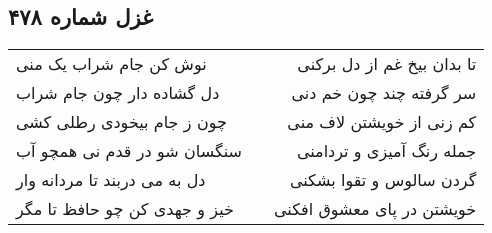 \begin{center}
\section*{غزل شماره ۴۷۸}
\label{sec:sh478}
\begin{longtable}{l p{0.5cm} r}
نوش کن جام شراب یک منی
&&
تا بدان بیخ غم از دل برکنی
\\
دل گشاده دار چون جام شراب
&&
سر گرفته چند چون خم دنی
\\
چون ز جام بیخودی رطلی کشی
&&
کم زنی از خویشتن لاف منی
\\
سنگسان شو در قدم نی همچو آب
&&
جمله رنگ آمیزی و تردامنی
\\
دل به می دربند تا مردانه وار
&&
گردن سالوس و تقوا بشکنی
\\
خیز و جهدی کن چو حافظ تا مگر
&&
خویشتن در پای معشوق افکنی
\\
\end{longtable}
\end{center}
